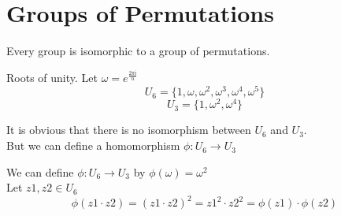 \section{Groups of Permutations}

\begin{theorem}
    Every group is isomorphic to a group of permutations.\\
\end{theorem}

\begin{eg}
    Roots of unity. Let $\omega = e^{\frac{2\pi i}{n}}$\\
    \[U_6 = \{1, \omega, \omega^2, \omega^3, \omega^4, \omega^5\}\]
    \[U_3 = \{1, \omega^2, \omega^4\}\]

    \noindent It is obvious that there is no isomorphism between $U_6$ and $U_3$.\\
    But we can define a homomorphism $\phi : U_6 \rightarrow U_3$\\
\end{eg}
\begin{answer}
    We can define $\phi : U_6 \rightarrow U_3$ by $\phi(\omega) = \omega^{2}$\\
    Let $z1, z2 \in U_6$\\
    \[\phi(z1 \cdot z2) = (z1 \cdot z2)^2 = z1^2 \cdot z2^2 = \phi(z1) \cdot \phi(z2)\]
\end{answer}
